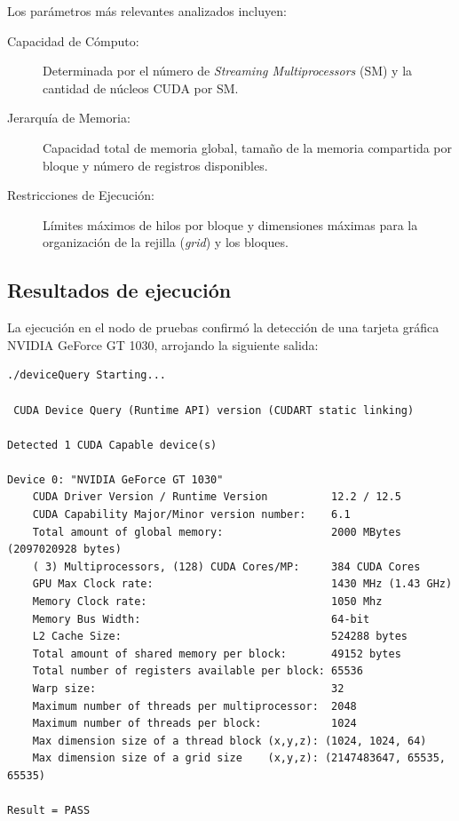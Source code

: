 \documentclass[12pt,a4paper]{report}
\begin{document}
Los parámetros más relevantes analizados incluyen:
\begin{description}
    \item[Capacidad de Cómputo:] Determinada por el número de \textit{Streaming Multiprocessors} (SM) y la cantidad de núcleos CUDA por SM.
    \item[Jerarquía de Memoria:] Capacidad total de memoria global, tamaño de la memoria compartida por bloque y número de registros disponibles.
    \item[Restricciones de Ejecución:] Límites máximos de hilos por bloque y dimensiones máximas para la organización de la rejilla (\textit{grid}) y los bloques.
\end{description}

\subsection{Resultados de ejecución}
La ejecución en el nodo de pruebas confirmó la detección de una tarjeta gráfica NVIDIA GeForce GT 1030, arrojando la siguiente salida:

\begin{lstlisting}[caption={Salida de ejecución de deviceQuery}, label={lst:deviceQuery}]
./deviceQuery Starting...

 CUDA Device Query (Runtime API) version (CUDART static linking)

Detected 1 CUDA Capable device(s)

Device 0: "NVIDIA GeForce GT 1030"
    CUDA Driver Version / Runtime Version          12.2 / 12.5
    CUDA Capability Major/Minor version number:    6.1
    Total amount of global memory:                 2000 MBytes (2097020928 bytes)
    ( 3) Multiprocessors, (128) CUDA Cores/MP:     384 CUDA Cores
    GPU Max Clock rate:                            1430 MHz (1.43 GHz)
    Memory Clock rate:                             1050 Mhz
    Memory Bus Width:                              64-bit
    L2 Cache Size:                                 524288 bytes
    Total amount of shared memory per block:       49152 bytes
    Total number of registers available per block: 65536
    Warp size:                                     32
    Maximum number of threads per multiprocessor:  2048
    Maximum number of threads per block:           1024
    Max dimension size of a thread block (x,y,z): (1024, 1024, 64)
    Max dimension size of a grid size    (x,y,z): (2147483647, 65535, 65535)

Result = PASS
\end{lstlisting}
\end{document}
